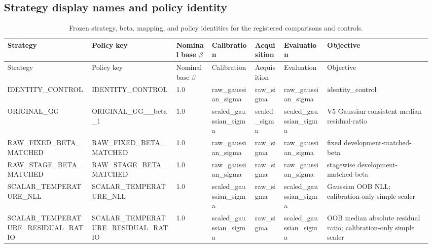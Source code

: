 \documentclass[10pt]{article}
\begin{document}
\begin{landscape}\subsection{Strategy display names and policy identity}

\begingroup\scriptsize
\begin{longtable}{L{1.0in}L{1.0in}L{.7in}L{1.15in}L{1.15in}L{1.15in}L{1.65in}}
\caption{Frozen strategy, beta, mapping, and policy identities for the registered comparisons and controls.}\\
\toprule
Strategy & Policy key & Nominal base $\beta$ & Calibration & Acquisition & Evaluation & Objective\\
\midrule
\endfirsthead
\toprule
Strategy & Policy key & Nominal base $\beta$ & Calibration & Acquisition & Evaluation & Objective\\
\midrule
\endhead
IDENTITY\_\allowbreak{}CONTROL & IDENTITY\_\allowbreak{}CONTROL & 1.0 & raw\_\allowbreak{}gaussian\_\allowbreak{}sigma & raw\_\allowbreak{}sigma & raw\_\allowbreak{}gaussian\_\allowbreak{}sigma & identity\_\allowbreak{}control\\
ORIGINAL\_\allowbreak{}GG & ORIGINAL\_\allowbreak{}GG\_\allowbreak{}\_\allowbreak{}beta\_\allowbreak{}1 & 1.0 & scaled\_\allowbreak{}gaussian\_\allowbreak{}sigma & scaled\_\allowbreak{}sigma & scaled\_\allowbreak{}gaussian\_\allowbreak{}sigma & V5 Gaussian-consistent median residual-ratio\\
RAW\_\allowbreak{}FIXED\_\allowbreak{}BETA\_\allowbreak{}MATCHED & RAW\_\allowbreak{}FIXED\_\allowbreak{}BETA\_\allowbreak{}MATCHED & 1.0 & raw\_\allowbreak{}gaussian\_\allowbreak{}sigma & raw\_\allowbreak{}sigma & raw\_\allowbreak{}gaussian\_\allowbreak{}sigma & fixed development-matched-beta\\
RAW\_\allowbreak{}STAGE\_\allowbreak{}BETA\_\allowbreak{}MATCHED & RAW\_\allowbreak{}STAGE\_\allowbreak{}BETA\_\allowbreak{}MATCHED & 1.0 & raw\_\allowbreak{}gaussian\_\allowbreak{}sigma & raw\_\allowbreak{}sigma & raw\_\allowbreak{}gaussian\_\allowbreak{}sigma & stagewise development-matched-beta\\
SCALAR\_\allowbreak{}TEMPERATURE\_\allowbreak{}NLL & SCALAR\_\allowbreak{}TEMPERATURE\_\allowbreak{}NLL & 1.0 & scaled\_\allowbreak{}gaussian\_\allowbreak{}sigma & raw\_\allowbreak{}sigma & scaled\_\allowbreak{}gaussian\_\allowbreak{}sigma & Gaussian OOB NLL; calibration-only simple scaler\\
SCALAR\_\allowbreak{}TEMPERATURE\_\allowbreak{}RESIDUAL\_\allowbreak{}RATIO & SCALAR\_\allowbreak{}TEMPERATURE\_\allowbreak{}RESIDUAL\_\allowbreak{}RATIO & 1.0 & scaled\_\allowbreak{}gaussian\_\allowbreak{}sigma & raw\_\allowbreak{}sigma & scaled\_\allowbreak{}gaussian\_\allowbreak{}sigma & OOB median absolute residual ratio; calibration-only simple scaler\\

\end{longtable}
\end{landscape}
\end{document}
